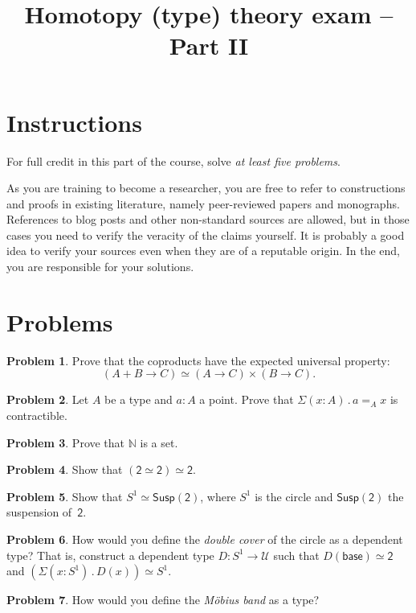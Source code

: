 \documentclass[12pt]{article}
\theoremstyle{definition}
\newtheorem{problem}{Problem}
\newcommand{\dsum}[1]{\Sigma (#1) \,.\,}
\newcommand{\univ}{\mathcal{U}}
\newcommand{\susp}[1]{\mathsf{Susp}(#1)}
\newcommand{\two}{\mathsf{2}}
\newcommand{\eqv}{\simeq}
\begin{document}
\title{Homotopy (type) theory exam -- Part II}
\author{}
\date{}
\maketitle

\section*{Instructions}

For full credit in this part of the course, solve \emph{at least five problems}.

As you are training to become a researcher, you are free to refer to constructions and
proofs in existing literature, namely peer-reviewed papers and monographs. References to
blog posts and other non-standard sources are allowed, but in those cases you need to
verify the veracity of the claims yourself. It is probably a good idea to verify your
sources even when they are of a reputable origin. In the end, you are responsible for your
solutions.

\section*{Problems}

\begin{problem}
  Prove that the coproducts have the expected universal property:
  \begin{equation*}
    (A + B \to C) \eqv (A \to C) \times (B \to C).
  \end{equation*}
\end{problem}

\begin{problem}
  Let $A$ be a type and $a : A$ a point. Prove that $\dsum{x : A} a =_A x$ is contractible.
\end{problem}

\begin{problem}
  Prove that $\mathbb{N}$ is a set.
\end{problem}

\begin{problem}
  Show that $(\two \eqv \two) \eqv \two$.
\end{problem}

\begin{problem}
  Show that $S^1 \eqv \susp{\two}$, where $S^1$ is the circle and $\susp{\two}$ the
  suspension of~$\two$.
\end{problem}

\begin{problem}
  How would you define the \emph{double cover} of the circle as a dependent type? That is,
  construct a dependent type $D : S^1 \to \univ$ such that $D(\mathsf{base}) \eqv \two$
  and $(\dsum{x : S^1} D(x)) \eqv S^1$.
\end{problem}

\begin{problem}
  How would you define the \emph{Möbius band} as a type?
\end{problem}
\end{document}
